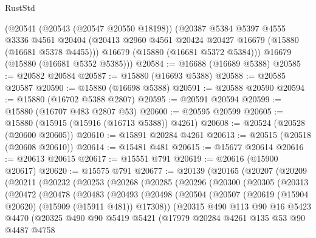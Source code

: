 \begin{lexlean}{RustStd}
\begin{coremodule}
    (@20541
      (@20543 (@20547 @20550 @18198))
      (@20387
        @5384
        @5397
        @4555
        @3336
        @4561
        @20404
        (@20413 @2960 @4561 @20424 @20427 @16679 (@15880 (@16681 @5378 @4455)))
        @16679
        (@15880 (@16681 @5372 @5384)))
      @16679
      (@15880 (@16681 @5352 @5385)))
@20584 := @16688 (@16689 @5388)
@20585 := @20582 @20584
@20587 := @15880 (@16693 @5388)
@20588 := @20585 @20587
@20590 := @15880 (@16698 @5388)
@20591 := @20588 @20590
@20594 := @15880 (@16702 @5388 @2807)
@20595 := @20591 @20594
@20599 := @15880 (@16707 @483 @2807 @53)
@20600 := @20595 @20599
@20605 := @15880 (@15915 (@15916 (@16713 @5388)) @4261)
@20608 := @20524 (@20528 (@20600 @20605))
@20610 := @15891 @20284 @4261
@20613 := @20515 (@20518 (@20608 @20610))
@20614 := @15481 @481
@20615 := @15677 @20614
@20616 := @20613 @20615
@20617 := @15551 @791
@20619 := @20616 (@15900 @20617)
@20620 := @15575 @791
@20677 := @20139
    (@20165
      (@20207
        (@20209
          (@20211
            (@20232
              (@20253
                (@20268
                  (@20285
                    (@20296
                      (@20300
                        (@20305
                          (@20313
                            (@20472
                              (@20478
                                (@20483
                                  (@20493
                                    (@20498
                                      (@20504
                                        (@20507
                                          (@20619 (@15904 @20620) (@15909 (@15911 @481)) @17308))
                                        (@20315
                                          @490
                                          @113
                                          @90
                                          @16
                                          @5423
                                          @4470
                                          (@20325
                                            @490
                                            @90
                                            @5419
                                            @5421
                                            (@17979
                                              @20284
                                              @4261
                                              @135
                                              @53
                                              @90
                                              @4487
                                              @4758

\end{coremodule}
\end{lexlean}
